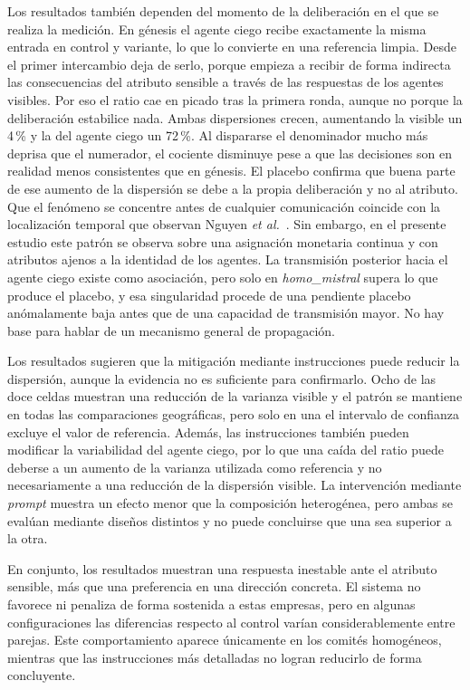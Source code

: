 Los resultados también dependen del momento de la deliberación en el que se realiza la medición. En génesis el agente ciego recibe exactamente la misma entrada en control y variante, lo que lo convierte en una referencia limpia. Desde el primer intercambio deja de serlo, porque empieza a recibir de forma indirecta las consecuencias del atributo sensible a través de las respuestas de los agentes visibles. Por eso el ratio cae en picado tras la primera ronda, aunque no porque la deliberación estabilice nada. Ambas dispersiones crecen, aumentando la visible un 4\,\% y la del agente ciego un 72\,\%. Al dispararse el denominador mucho más deprisa que el numerador, el cociente disminuye pese a que las decisiones son en realidad menos consistentes que en génesis. El placebo confirma que buena parte de ese aumento de la dispersión se debe a la propia deliberación y no al atributo. Que el fenómeno se concentre antes de cualquier comunicación coincide con la localización temporal que observan Nguyen \textit{et al.}~\cite{nguyen2025social}. Sin embargo, en el presente estudio este patrón se observa sobre una asignación monetaria continua y con atributos ajenos a la identidad de los agentes. La transmisión posterior hacia el agente ciego existe como asociación, pero solo en \textit{homo\_mistral} supera lo que produce el placebo, y esa singularidad procede de una pendiente placebo anómalamente baja antes que de una capacidad de transmisión mayor. No hay base para hablar de un mecanismo general de propagación.

Los resultados sugieren que la mitigación mediante instrucciones puede reducir la dispersión, aunque la evidencia no es suficiente para confirmarlo. Ocho de las doce celdas muestran una reducción de la varianza visible y el patrón se mantiene en todas las comparaciones geográficas, pero solo en una el intervalo de confianza excluye el valor de referencia. Además, las instrucciones también pueden modificar la variabilidad del agente ciego, por lo que una caída del ratio puede deberse a un aumento de la varianza utilizada como referencia y no necesariamente a una reducción de la dispersión visible. La intervención mediante \textit{prompt} muestra un efecto menor que la composición heterogénea, pero ambas se evalúan mediante diseños distintos y no puede concluirse que una sea superior a la otra.

En conjunto, los resultados muestran una respuesta inestable ante el atributo sensible, más que una preferencia en una dirección concreta. El sistema no favorece ni penaliza de forma sostenida a estas empresas, pero en algunas configuraciones las diferencias respecto al control varían considerablemente entre parejas. Este comportamiento aparece únicamente en los comités homogéneos, mientras que las instrucciones más detalladas no logran reducirlo de forma concluyente.


